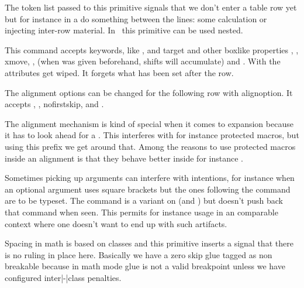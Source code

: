 \stopoldprimitive

\startoldprimitive[title={\prm {noalign}}]

The token list passed to this primitive signals that we don't enter a table row
yet but for instance in a  do something between the lines: some
calculation or injecting inter-row material. In \LUAMETATEX\ this primitive can
be used nested.

This command accepts keywords, like ,  and \type
{target} and other boxlike properties , , \type
{xmove}, ,  (when  was given beforehand,
shifts will accumulate) and . With  the
attributes get wiped. It forgets what has been set after the row.

The alignment options can be changed for the following row with \prm
{alignoption}. It accepts , , \type
{nofirstskip},  and .

\stopoldprimitive

\startnewprimitive[title={\prm {noaligned}}]

The alignment mechanism is kind of special when it comes to expansion because it
has to look ahead for a . This interferes with for instance
protected macros, but using this prefix we get around that. Among the reasons to
use protected macros inside an alignment is that they behave better inside for
instance .

\stopnewprimitive

\startnewprimitive[title={\prm {noarguments}}]

Sometimes picking up arguments can interfere with intentions, for instance when
an optional argument uses square brackets but the ones following the command are
to be typeset. The  command is a variant on  (and
) but doesn't push back that command when seen. This permits for
instance usage in an  comparable context where one doesn't want to end
up with such artifacts.

\stopnewprimitive

\startnewprimitive[title={\prm {noatomruling}}]

Spacing in math is based on classes and this primitive inserts a signal that
there is no ruling in place here. Basically we have a zero skip glue tagged as
non breakable because in math mode glue is not a valid breakpoint unless we have
configured inter|-|class penalties.

